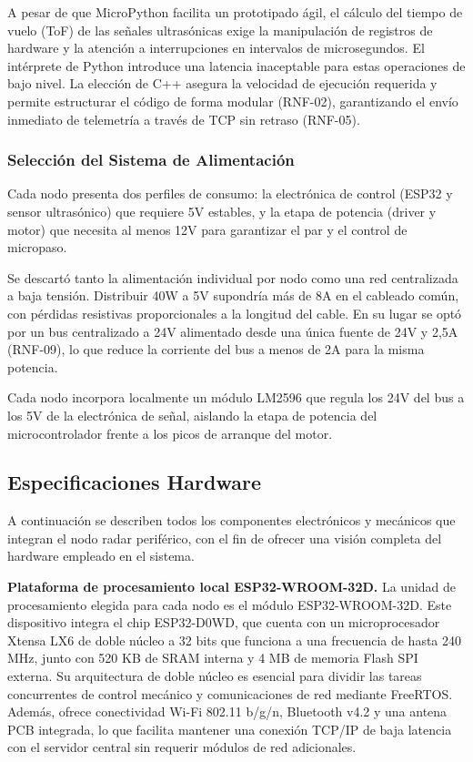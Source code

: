 A pesar de que MicroPython facilita un prototipado ágil, el cálculo del tiempo de vuelo (ToF) de las señales ultrasónicas exige la manipulación de registros de hardware y la atención a interrupciones en intervalos de microsegundos. El intérprete de Python introduce una latencia inaceptable para estas operaciones de bajo nivel. La elección de C++ asegura la velocidad de ejecución requerida y permite estructurar el código de forma modular (RNF-02), garantizando el envío inmediato de telemetría a través de TCP sin retraso (RNF-05).

\subsubsection*{Selección del Sistema de Alimentación}

Cada nodo presenta dos perfiles de consumo: la electrónica de control (ESP32 y sensor ultrasónico) que requiere 5V estables, y la etapa de potencia (driver y motor) que necesita al menos 12V para garantizar el par y el control de micropaso.

Se descartó tanto la alimentación individual por nodo como una red centralizada a baja tensión. Distribuir 40W a 5V supondría más de 8A en el cableado común, con pérdidas resistivas proporcionales a la longitud del cable. En su lugar se optó por un bus centralizado a 24V alimentado desde una única fuente de 24V y 2{,}5A (RNF-09), lo que reduce la corriente del bus a menos de 2A para la misma potencia.

Cada nodo incorpora localmente un módulo LM2596 que regula los 24V del bus a los 5V de la electrónica de señal, aislando la etapa de potencia del microcontrolador frente a los picos de arranque del motor.

\subsection{Especificaciones Hardware}

A continuación se describen todos los componentes electrónicos y mecánicos que integran el nodo radar periférico, con el fin de ofrecer una visión completa del hardware empleado en el sistema.

\textbf{Plataforma de procesamiento local ESP32-WROOM-32D.} La unidad de procesamiento elegida para cada nodo es el módulo ESP32-WROOM-32D. Este dispositivo integra el chip ESP32-D0WD, que cuenta con un microprocesador Xtensa LX6 de doble núcleo a 32 bits que funciona a una frecuencia de hasta 240 MHz, junto con 520 KB de SRAM interna y 4 MB de memoria Flash SPI externa. Su arquitectura de doble núcleo es esencial para dividir las tareas concurrentes de control mecánico y comunicaciones de red mediante FreeRTOS. Además, ofrece conectividad Wi-Fi 802.11 b/g/n, Bluetooth v4.2 y una antena PCB integrada, lo que facilita mantener una conexión TCP/IP de baja latencia con el servidor central sin requerir módulos de red adicionales.

